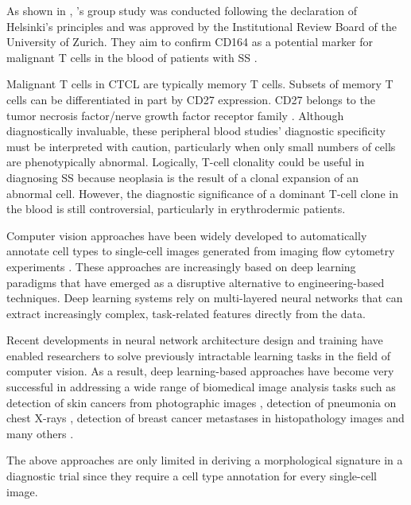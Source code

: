 As shown in \eg{}, \cite{emma}'s group study was conducted following the declaration of Helsinki's principles and was approved by the Institutional Review Board of the University of Zurich.  They aim to confirm CD164 as a potential marker for malignant T cells in the blood of patients with SS \cite{emma}.

Malignant T cells in CTCL are typically memory T cells. Subsets of memory T cells can be differentiated in part by CD27 expression\cite{nagler-31}\cite{nagler-33}. CD27 belongs to the tumor necrosis factor/nerve growth factor receptor family \cite{nagler}. Although diagnostically invaluable, these peripheral blood studies' diagnostic specificity must be interpreted with caution, particularly when only small numbers of cells are phenotypically abnormal\cite{nagler-6}. Logically, T-cell clonality could be useful in diagnosing SS because neoplasia is the result of a clonal expansion of an abnormal cell\cite{nagler}. However, the diagnostic significance of a dominant T-cell clone in the blood is still controversial, particularly in erythrodermic patients. 

Computer vision approaches have been widely developed to automatically annotate cell types to single-cell images generated from imaging flow cytometry experiments \cite{15}. These approaches are increasingly based on deep learning paradigms that have emerged as a disruptive alternative to engineering-based techniques. Deep learning systems rely on multi-layered neural networks that can extract increasingly complex, task-related features directly from the data. 

Recent developments in neural network architecture design and training have enabled researchers to solve previously intractable learning tasks in the field of computer vision. As a result, deep learning-based approaches have become very successful in addressing a wide range of biomedical image analysis tasks such as detection of skin cancers from photographic images \cite{10}, detection of pneumonia on chest X-rays \cite{13}, detection of breast cancer metastases in histopathology images and many others \cite{2}. 

The above approaches are only limited in deriving a morphological signature in a diagnostic trial since they require a cell type annotation for every single-cell image.

